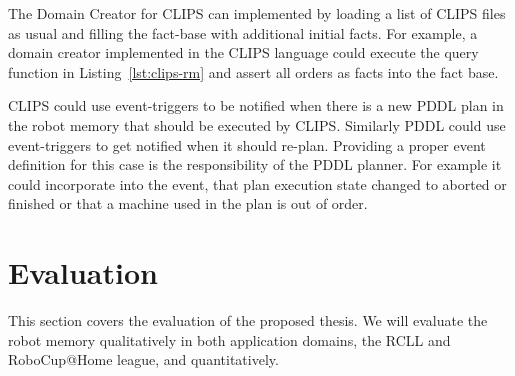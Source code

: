 \documentclass[a4paper,11pt]{article}
\newcommand{\reflst}[1]{Listing~\ref{#1}}
\begin{document}
The Domain Creator for CLIPS can implemented by loading a list of
CLIPS files as usual and filling the fact-base with additional initial
facts. For example, a domain creator implemented in the CLIPS language
could execute the query function in \reflst{lst:clips-rm} and assert
all orders as facts into the fact base.

CLIPS could use event-triggers to be notified when there is a new PDDL
plan in the robot memory that should be executed by CLIPS. Similarly
PDDL could use event-triggers to get notified when it should
re-plan. Providing a proper event definition for this case is the
responsibility of the PDDL planner. For example it could incorporate into the
event, that plan execution state changed to aborted or finished or
that a machine used in the plan is out of order.

\section{Evaluation}
\label{sec:eval}
This section covers the evaluation of the proposed thesis. We will
evaluate the robot memory qualitatively in both application domains,
the RCLL and RoboCup@Home league, and quantitatively.
\end{document}

